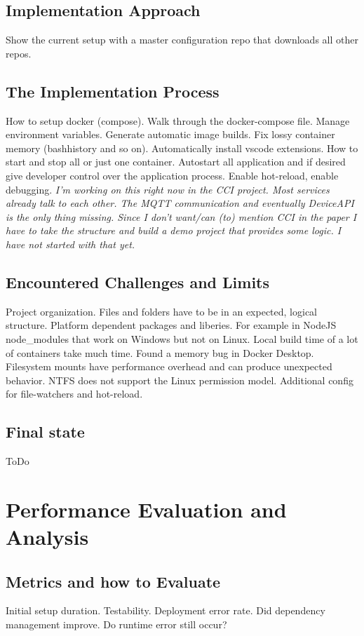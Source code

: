 \documentclass[12pt, a4paper]{article}
\begin{document}
    \subsection{Implementation Approach}
    Show the current setup with a master configuration repo that downloads all other repos.
    \subsection{The Implementation Process}
    How to setup docker (compose). Walk through the docker-compose file. Manage environment variables. Generate automatic image builds. Fix lossy container memory (bashhistory and so on). Automatically install vscode extensions. How to start and stop all or just one container. Autostart all application and if desired give developer control over the application process. Enable hot-reload, enable debugging.\newline
    \textit{I'm working on this right now in the CCI project. Most services already talk to each other. The MQTT communication and eventually DeviceAPI is the only thing missing. Since I don't want/can (to) mention CCI in the paper I have to take the structure and build a demo project that provides some logic. I have not started with that yet.}\label{ssec::imp_progress}
    \subsection{Encountered Challenges and Limits}
    Project organization. Files and folders have to be in an expected, logical structure. Platform dependent packages and liberies. For example in NodeJS node\_modules that work on Windows but not on Linux. Local build time of a lot of containers take much time. Found a memory bug in Docker Desktop. Filesystem mounts have performance overhead and can produce unexpected behavior. NTFS does not support the Linux permission model. Additional config for file-watchers and hot-reload.
    \subsection{Final state}
    ToDo

\section{Performance Evaluation and Analysis}\label{sec::eval}
    \subsection{Metrics and how to Evaluate}
    Initial setup duration. Testability. Deployment error rate. Did dependency management improve. Do runtime error still occur?
\end{document}
